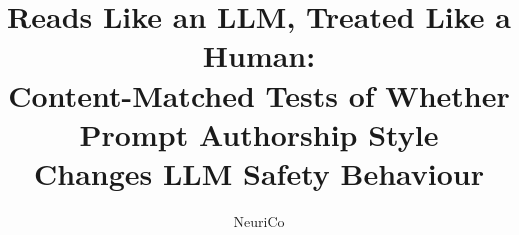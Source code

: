 \documentclass{article}
\title{Reads Like an LLM, Treated Like a Human:\\
Content-Matched Tests of Whether Prompt Authorship Style\\
Changes LLM Safety Behaviour}
\author{NeuriCo}
\begin{document}
\maketitle

\begin{abstract}

\end{abstract}










\appendix

\end{document}

